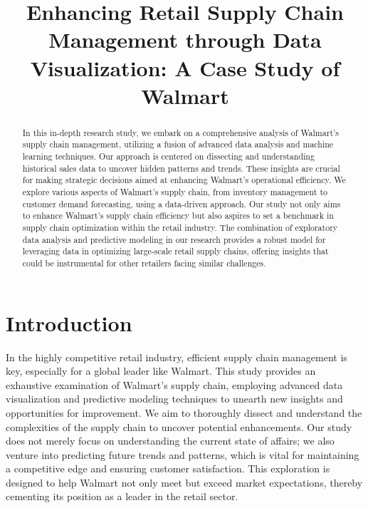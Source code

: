 \documentclass[conference]{IEEEtran}
\title{Enhancing Retail Supply Chain Management through Data Visualization: A Case Study of Walmart}
\author{\IEEEauthorblockN{Harsh Dalwadi, Nilka Patel, Krutarth Majmundar}}
\begin{document}
\maketitle

\begin{abstract}
In this in-depth research study, we embark on a comprehensive analysis of Walmart's supply chain management, utilizing a fusion of advanced data analysis and machine learning techniques. Our approach is centered on dissecting and understanding historical sales data to uncover hidden patterns and trends. These insights are crucial for making strategic decisions aimed at enhancing Walmart’s operational efficiency. We explore various aspects of Walmart's supply chain, from inventory management to customer demand forecasting, using a data-driven approach. Our study not only aims to enhance Walmart's supply chain efficiency but also aspires to set a benchmark in supply chain optimization within the retail industry. The combination of exploratory data analysis and predictive modeling in our research provides a robust model for leveraging data in optimizing large-scale retail supply chains, offering insights that could be instrumental for other retailers facing similar challenges.
\end{abstract}

\IEEEpeerreviewmaketitle

\section{Introduction}
In the highly competitive retail industry, efficient supply chain management is key, especially for a global leader like Walmart. This study provides an exhaustive examination of Walmart's supply chain, employing advanced data visualization and predictive modeling techniques to unearth new insights and opportunities for improvement. We aim to thoroughly dissect and understand the complexities of the supply chain to uncover potential enhancements. Our study does not merely focus on understanding the current state of affairs; we also venture into predicting future trends and patterns, which is vital for maintaining a competitive edge and ensuring customer satisfaction. This exploration is designed to help Walmart not only meet but exceed market expectations, thereby cementing its position as a leader in the retail sector.
\end{document}
